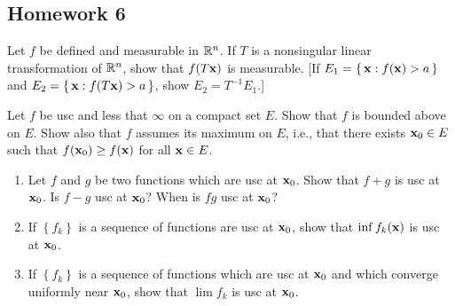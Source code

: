 \subsection{Homework 6}
\begin{problem}
  Let $f$ be defined and measurable in $\mathbb{R}^n$. If $T$ is a nonsingular
  linear transformation of $\mathbb{R}^n$, show that $f(T\mathbf{x})$ is
  measurable. [If $E_1=\left\{\,\mathbf{x}: f(\mathbf{x})>a\,\right\}$ and
  $E_2=\left\{\,\mathbf{x}:f(T\mathbf{x})>a\,\right\}$, show $E_2=T^{-1}E_1$.]
\end{problem}
\begin{solution}
\end{solution}

\begin{problem}
  Let $f$ be usc and less that $\infty$ on a compact set $E$. Show that $f$
  is bounded above on $E$. Show also that $f$ assumes its maximum on $E$,
  i.e., that there exists $\mathbf{x}_0\in E$ such that $f(\mathbf{x}_0)\geq f(\mathbf{x})$
  for all $\mathbf{x}\in E$.
\end{problem}
\begin{solution}
\end{solution}

\begin{problem}
  \hfill
  \begin{enumerate}[label=(\alph*),noitemsep]
  \item Let $f$ and $g$ be two functions which are usc at $\mathbf{x}_0$. Show
    that $f+g$ is usc at $\mathbf{x}_0$. Is $f-g$ usc at $\mathbf{x}_0$? When is $fg$
    usc at $\mathbf{x}_0$?
  \item If $\left\{f_k\right\}$ is a sequence of functions are usc at
    $\mathbf{x}_0$, show that $\inf f_k(\mathbf{x})$ is usc at $\mathbf{x}_0$.
  \item If $\left\{f_k\right\}$ is a sequence of functions which are usc at
    $\mathbf{x}_0$ and which converge uniformly near $\mathbf{x}_0$, show that
    $\lim f_k$ is usc at $\mathbf{x}_0$.
  \end{enumerate}
\end{problem}
\begin{solution}
\end{solution}

